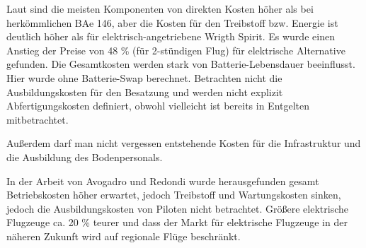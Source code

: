 Laut sind die meisten Komponenten von direkten Kosten höher als bei herkömmlichen BAe 146, aber die Kosten für den 
Treibstoff bzw. Energie ist deutlich höher als für elektrisch-angetriebene Wrigth Spirit. Es wurde einen Anstieg 
der Preise von 48 \% (für 2-stündigen Flug) für elektrische Alternative gefunden. Die Gesamtkosten werden stark von Batterie-Lebensdauer 
beeinflusst. Hier wurde ohne Batterie-Swap berechnet. Betrachten nicht die Ausbildungskosten für den Besatzung und werden 
nicht explizit Abfertigungskosten definiert, obwohl vielleicht ist bereits in Entgelten mitbetrachtet. \cite{goodge2024analysis}

Außerdem darf man nicht vergessen entstehende Kosten für die Infrastruktur und die Ausbildung des Bodenpersonals.

In der Arbeit von Avogadro und Redondi wurde herausgefunden gesamt Betriebskosten höher erwartet, jedoch Treibstoff und Wartungskosten sinken,
jedoch die Ausbildungskosten von Piloten nicht betrachtet. Größere elektrische Flugzeuge ca. 20 \% teurer und dass der Markt für elektrische 
Flugzeuge in der näheren Zukunft wird auf regionale Flüge beschränkt.
